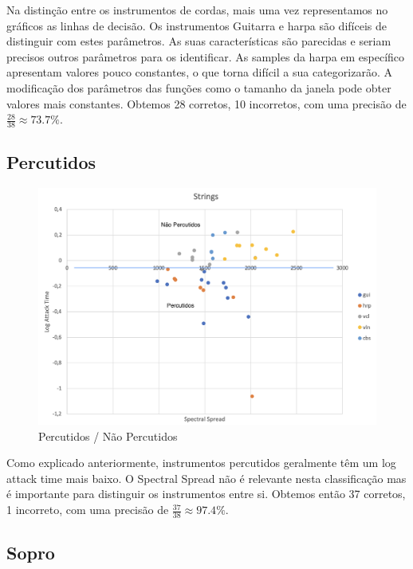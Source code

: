 Na distinção entre os instrumentos de cordas, mais uma vez representamos no gráficos as linhas de decisão.
Os instrumentos Guitarra e harpa são difíceis de distinguir com estes parâmetros.
As suas características são parecidas e seriam precisos outros parâmetros para os identificar.
As samples da harpa em específico apresentam valores pouco constantes, o que torna difícil a sua categorizarão.
A modificação dos parâmetros das funções como o tamanho da janela pode obter valores mais constantes.
Obtemos 28 corretos, 10 incorretos, com uma precisão de $\frac{28}{38} \approx 73.7\%$.


\subsection{Percutidos}

\begin{figure}[H]
    \centering
    \includegraphics[width=.8\linewidth]{figs/comp_1.png}
    \caption{Percutidos / Não Percutidos}
    \label{fig:7}
\end{figure}

Como explicado anteriormente, instrumentos percutidos geralmente têm um log attack time mais baixo. 
O Spectral Spread não é relevante nesta classificação mas é importante para distinguir os instrumentos entre si.
Obtemos então 37 corretos, 1 incorreto, com uma precisão de $\frac{37}{38} \approx 97.4\%$.


\subsection{Sopro}

